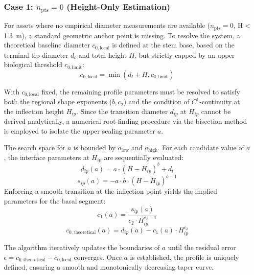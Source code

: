 \documentclass[twocolumn, bibliography=totoc]{scrartcl}
\begin{document}
\subsubsection{Case 1: $n_{\text{pts}} = 0$ (Height-Only Estimation)}

For assets where no empirical diameter measurements are available ($n_{\text{pts}} = 0$, H < \qty{1.3}{m}), a standard geometric anchor point is missing. To resolve the system, a theoretical baseline diameter $c_{0,\text{local}}$ is defined at the stem base, based on the terminal tip diameter $d_t$ and total height $H$, but strictly capped by an upper biological threshold $c_{0,\text{limit}}$:
\begin{equation}
    c_{0,\text{local}} = \min(d_t + H, c_{0,\text{limit}})
\end{equation}

With $c_{0,\text{local}}$ fixed, the remaining profile parameters must be resolved to satisfy both the regional shape exponents ($b, c_2$) and the condition of $C^1$-continuity at the inflection height $H_{ip}$. Since the transition diameter $d_{ip}$ at $H_{ip}$ cannot be derived analytically, a numerical root-finding procedure via the bisection method is employed to isolate the upper scaling parameter $a$. 

The search space for $a$ is bounded by $a_{\text{low}}$ and $a_{\text{high}}$. For each candidate value of $a$, the interface parameters at $H_{ip}$ are sequentially evaluated:
\begin{equation}
    d_{ip}(a) = a \cdot (H - H_{ip})^b + d_t
\end{equation}
\begin{equation}
    s_{ip}(a) = -a \cdot b \cdot (H - H_{ip})^{b-1}
\end{equation}
Enforcing a smooth transition at the inflection point yields the implied parameters for the basal segment:
\begin{equation}
    c_1(a) = \frac{s_{ip}(a)}{c_2 \cdot H_{ip}^{c_2-1}}
\end{equation}
\begin{equation}
    c_{0,\text{theoretical}}(a) = d_{ip}(a) - c_1(a) \cdot H_{ip}^{c_2}
\end{equation}

The algorithm iteratively updates the boundaries of $a$ until the residual error $\epsilon = c_{0,\text{theoretical}} - c_{0,\text{local}}$ converges. Once $a$ is established, the profile is uniquely defined, ensuring a smooth and monotonically decreasing taper curve.
\end{document}
